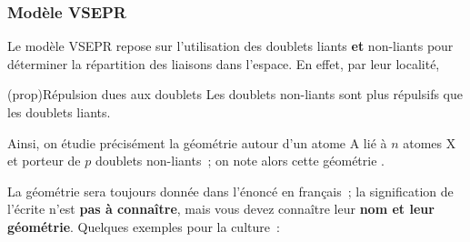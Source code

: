 \documentclass[../../main/main.tex]{subfiles}
\begin{document}
\subsubsection{Modèle VSEPR}
Le modèle VSEPR repose sur l'utilisation des doublets liants \textbf{et}
non-liants pour déterminer la répartition des liaisons dans l'espace. En effet,
par leur localité,
\begin{tcb*}(prop){Répulsion dues aux doublets}
	Les doublets non-liants sont plus répulsifs que les doublets liants.
\end{tcb*}

Ainsi, on étudie précisément la géométrie autour d'un atome A
lié à $n$ atomes X et porteur de $p$ doublets non-liants~; on note alors cette
géométrie .

La géométrie sera toujours donnée dans l'énoncé en français~; la signification
de l'écrite  n'est \textbf{pas à connaître}, mais vous devez
connaître leur \textbf{nom et leur géométrie}. Quelques exemples pour la
culture~:
\end{document}

